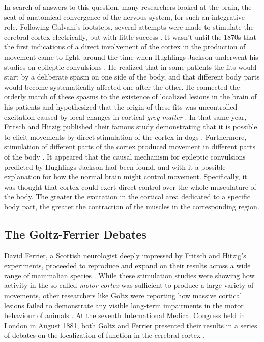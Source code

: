In search of answers to this question, many researchers looked at the brain, the seat of anatomical convergence of the nervous system, for such an integrative role. Following Galvani's footsteps, several attempts were made to stimulate the cerebral cortex electrically, but with little success \cite{Gross2007}. It wasn't until the 1870s that the first indications of a direct involvement of the cortex in the production of movement came to light, around the time when Hughlings Jackson underwent his studies on epileptic convulsions \cite{Jackson1870}. He realized that in some patients the fits would start by a deliberate spasm on one side of the body, and that different body parts would become systematically affected one after the other. He connected the orderly march of these spasms to the existence of localized lesions in the brain of his patients and hypothesized that the origin of these fits was uncontrolled excitation caused by local changes in cortical \emph{grey matter} \cite{Jackson1870}. In that same year, Fritsch and Hitzig published their famous study demonstrating that it is possible to elicit movements by direct stimulation of the cortex in dogs \cite{Fritsch1870}. Furthermore, stimulation of different parts of the cortex produced movement in different parts of the body \cite{Fritsch1870}. It appeared that the causal mechanism for epileptic convulsions predicted by Hughlings Jackson had been found, and with it a possible explanation for how the normal brain might control movement. Specifically, it was thought that cortex could exert direct control over the whole musculature of the body. The greater the excitation in the cortical area dedicated to a specific body part, the greater the contraction of the muscles in the corresponding region.

\subsection{The Goltz-Ferrier Debates}

David Ferrier, a Scottish neurologist deeply impressed by Fritsch and Hitzig's experiments, proceeded to reproduce and expand on their results across a wide range of mammalian species \cite{Ferrier1873}. While these stimulation studies were showing how activity in the so called \emph{motor cortex} was sufficient to produce a large variety of movements, other researchers like Goltz were reporting how massive cortical lesions failed to demonstrate any visible long-term impairments in the motor behaviour of animals \cite{Goltz1888}. At the seventh International Medical Congress held in London in August 1881, both Goltz and Ferrier presented their results in a series of debates on the localization of function in the cerebral cortex \cite{Tyler2000}.

